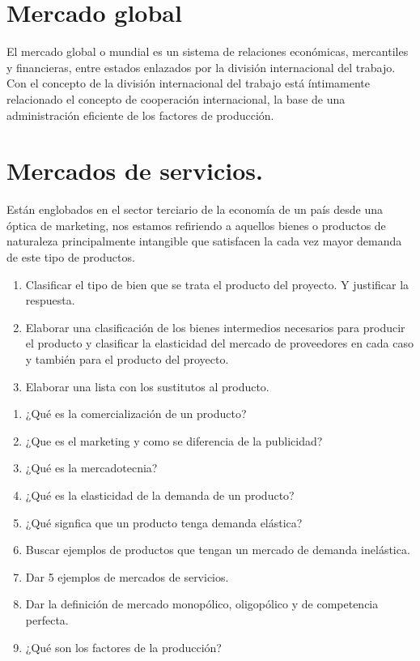 \documentclass[../main]{subfiles}
\begin{document}
\section{Mercado global}
El mercado global o mundial es un sistema de relaciones económicas, mercantiles y financieras, entre estados enlazados por la división internacional del trabajo. Con el concepto de la división internacional del trabajo está íntimamente relacionado el concepto de cooperación internacional, la base de una administración eficiente de los factores de producción.

\section{Mercados de servicios.}
Están englobados en el sector terciario de la economía de un país desde una óptica de marketing, nos estamos refiriendo a aquellos bienes o productos de naturaleza principalmente intangible que satisfacen la cada vez mayor demanda de este tipo de productos.




\begin{enumerate}
    \item Clasificar el tipo de bien que se trata el producto del proyecto. Y justificar la respuesta.
    \item Elaborar una clasificación de los bienes intermedios necesarios para producir el producto y clasificar la elasticidad del mercado de proveedores en cada caso y también para el producto del proyecto.
    \item Elaborar una lista con los sustitutos al producto.
\end{enumerate}

\begin{enumerate}
    \item ¿Qué es la comercialización de un producto?
    \item ¿Que es el marketing y como se diferencia de la publicidad?
    \item ¿Qué es la mercadotecnia?
    \item ¿Qué es la elasticidad de la demanda de un producto?
    \item ¿Qué signfica que un producto tenga demanda elástica?
    \item Buscar ejemplos de productos que tengan un mercado de demanda inelástica.
    \item Dar 5 ejemplos de mercados de servicios.
    \item Dar la definición de mercado monopólico, oligopólico y de competencia perfecta.
    \item ¿Qué son los factores de la producción?
\end{enumerate}
\end{document}

